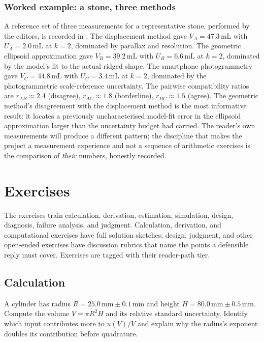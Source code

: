 \begin{project}
\subsubsection*{Worked example: a stone, three methods}

A reference set of three measurements for a representative stone,
performed by the editors, is recorded in
.
The displacement method gave $V_{A} = 47.3 \,\si{\milli\liter}$
with $U_{A} = 2.0 \,\si{\milli\liter}$ at $k = 2$, dominated by
parallax and resolution. The geometric ellipsoid approximation gave
$V_{B} = 39.2 \,\si{\milli\liter}$ with $U_{B} = 6.6 \,\si{\milli
\liter}$ at $k = 2$, dominated by the model's fit to the actual
ridged shape. The smartphone photogrammetry gave $V_{C} = 44.8 \,
\si{\milli\liter}$ with $U_{C} = 3.4 \,\si{\milli\liter}$ at $k = 2$,
dominated by the photogrammetric scale-reference uncertainty. The
pairwise compatibility ratios are $r_{AB} \approx 2.4$ (disagree),
$r_{AC} \approx 1.8$ (borderline), $r_{BC} \approx 1.5$ (agree).
The geometric method's disagreement with the displacement method is
the most informative result: it locates a previously
uncharacterised model-fit error in the ellipsoid approximation
larger than the uncertainty budget had carried. The reader's own
measurements will produce a different pattern; the discipline that
makes the project a measurement experience and not a sequence of
arithmetic exercises is the comparison of \emph{their} numbers,
honestly recorded.
\end{project}

\section{Exercises}

The exercises train calculation, derivation, estimation, simulation,
design, diagnosis, failure analysis, and judgment. Calculation,
derivation, and computational exercises have full solution sketches;
design, judgment, and other open-ended exercises have discussion
rubrics that name the points a defensible reply must cover.
Exercises are tagged with their reader-path tier.

\subsection*{Calculation}

\begin{exercise}
A cylinder has radius $R = 25.0 \,\si{\milli\meter} \pm 0.1 \,\si
{\milli\meter}$ and height $H = 80.0 \,\si{\milli\meter} \pm 0.5 \,
\si{\milli\meter}$. Compute the volume $V = \pi R^{2} H$ and its
relative standard uncertainty. Identify which input contributes more
to $u(V)/V$ and explain why the radius's exponent doubles its
contribution before quadrature.
\end{exercise}

